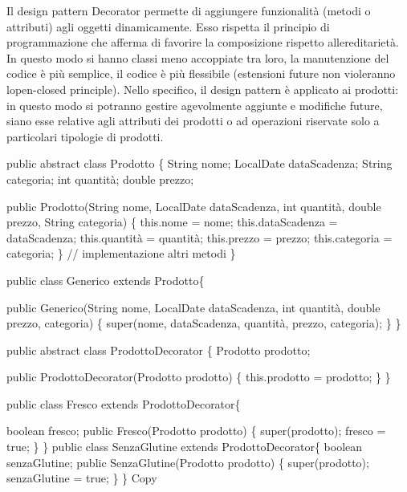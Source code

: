 \documentclass[
]{article}
\newenvironment{Shaded}{}{}
\newcommand{\NormalTok}[1]{#1}
\begin{document}
Il design pattern Decorator permette di aggiungere funzionalità (metodi
o attributi) agli oggetti dinamicamente. Esso rispetta il principio di
programmazione che afferma di favorire la composizione rispetto
all\textquotesingle ereditarietà. In questo modo si hanno classi meno
accoppiate tra loro, la manutenzione del codice è più semplice, il
codice è più flessibile (estensioni future non violeranno
l\textquotesingle open-closed principle). Nello specifico, il design
pattern è applicato ai prodotti: in questo modo si potranno gestire
agevolmente aggiunte e modifiche future, siano esse relative agli
attributi dei prodotti o ad operazioni riservate solo a particolari
tipologie di prodotti.

\begin{Shaded}
\begin{Highlighting}[]
\NormalTok{public abstract class Prodotto \{  }
\NormalTok{    String nome;  }
\NormalTok{    LocalDate dataScadenza;  }
\NormalTok{    String categoria;  }
\NormalTok{    int quantità;  }
\NormalTok{    double prezzo;  }
  
\NormalTok{    public Prodotto(String nome, LocalDate dataScadenza, int quantità, double prezzo, String categoria) \{  }
\NormalTok{       this.nome = nome;  }
\NormalTok{       this.dataScadenza = dataScadenza;  }
\NormalTok{       this.quantità = quantità;  }
\NormalTok{       this.prezzo = prezzo;}
\NormalTok{       this.categoria = categoria;  }
\NormalTok{    \}}
\NormalTok{    // implementazione altri metodi}
\NormalTok{\}}

\NormalTok{public class Generico extends Prodotto\{  }
  
\NormalTok{    public Generico(String nome, LocalDate dataScadenza, int quantità, double prezzo, categoria) \{  }
\NormalTok{       super(nome, dataScadenza, quantità, prezzo, categoria); }
\NormalTok{    \}}
\NormalTok{\}}

\NormalTok{public abstract class ProdottoDecorator \{  }
\NormalTok{    Prodotto prodotto;  }
  
\NormalTok{    public ProdottoDecorator(Prodotto prodotto) \{  }
\NormalTok{       this.prodotto = prodotto;  }
\NormalTok{    \}  }
\NormalTok{\}}

\NormalTok{public class Fresco extends ProdottoDecorator\{  }
  
\NormalTok{    boolean fresco;  }
\NormalTok{    public Fresco(Prodotto prodotto) \{  }
\NormalTok{       super(prodotto);  }
\NormalTok{       fresco = true;  }
\NormalTok{    \}  }
\NormalTok{\}}
\NormalTok{public class SenzaGlutine extends ProdottoDecorator\{  }
\NormalTok{    boolean senzaGlutine;  }
\NormalTok{    public SenzaGlutine(Prodotto prodotto) \{  }
\NormalTok{       super(prodotto);  }
\NormalTok{       senzaGlutine = true;  }
\NormalTok{    \}  }
\NormalTok{\}}
\NormalTok{Copy}
\end{Highlighting}
\end{Shaded}
\end{document}
